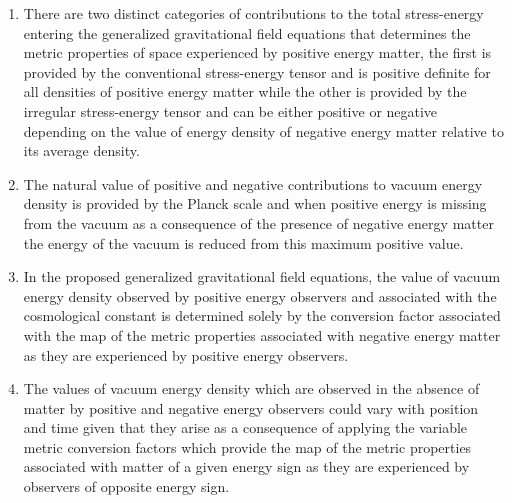 \documentclass[notitlepage,12pt]{report}
\begin{document}
\begin{enumerate}
\item There are two distinct categories of contributions to the total stress-energy entering the generalized gravitational field equations that determines the metric properties of space experienced by positive energy matter, the first is provided by the conventional stress-energy tensor and is positive definite for all densities of positive energy matter while the other is provided by the irregular stress-energy tensor and can be either positive or negative depending on the value of energy density of negative energy matter relative to its average density.

\item The natural value of positive and negative contributions to vacuum energy density is provided by the Planck scale and when positive energy is missing from the vacuum as a consequence of the presence of negative energy matter the energy of the vacuum is reduced from this maximum positive value.

\item In the proposed generalized gravitational field equations, the value of vacuum energy density observed by positive energy observers and associated with the cosmological constant is determined solely by the conversion factor associated with the map of the metric properties associated with negative energy matter as they are experienced by positive energy observers.

\item The values of vacuum energy density which are observed in the absence of matter by positive and negative energy observers could vary with position and time given that they arise as a consequence of applying the variable metric conversion factors which provide the map of the metric properties associated with matter of a given energy sign as they are experienced by observers of opposite energy sign.


\end{enumerate}
\end{document}
